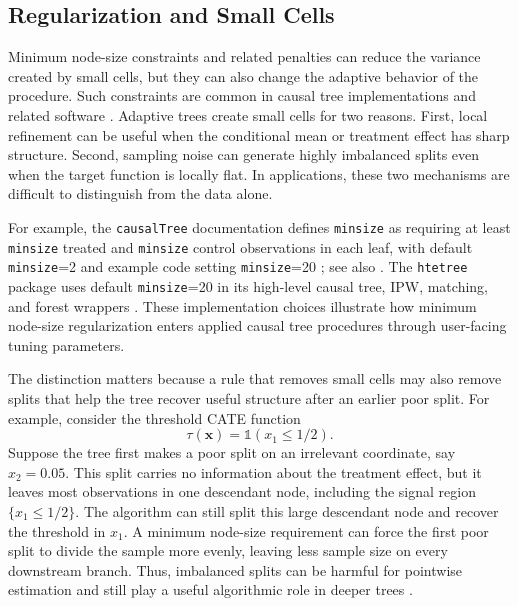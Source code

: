 \documentclass[10pt]{article}
\def\bx{\mathbf{x}}
\newcommand{\Indicator}{\mathds{1}}
\theoremstyle{definition}
\theoremstyle{remark}
\begin{document}
\subsection{Regularization and Small Cells}\label{sa-sec:regularization-details}

Minimum node-size constraints and related penalties can reduce the variance created by small cells, but they can also change the adaptive behavior of the procedure. Such constraints are common in causal tree implementations \citep[Online Appendix]{Athey-Imbens_2016_PNAS} and related software \citep{Athey-Imbens_2026_causalTree,Xu-Shinkre-Brand_2026_htetree}. Adaptive trees create small cells for two reasons. First, local refinement can be useful when the conditional mean or treatment effect has sharp structure. Second, sampling noise can generate highly imbalanced splits even when the target function is locally flat. In applications, these two mechanisms are difficult to distinguish from the data alone.

For example, the \texttt{causalTree} documentation defines \texttt{minsize} as requiring at least \texttt{minsize} treated and \texttt{minsize} control observations in each leaf, with default \texttt{minsize}=2 and example code setting \texttt{minsize}=20 \citep[Online Appendix]{Athey-Imbens_2016_PNAS}; see also \citet{Athey-Imbens_2026_causalTree}. The \texttt{htetree} package uses default \texttt{minsize}=20 in its high-level causal tree, IPW, matching, and forest wrappers \citep{Xu-Shinkre-Brand_2026_htetree}. These implementation choices illustrate how minimum node-size regularization enters applied causal tree procedures through user-facing tuning parameters.

The distinction matters because a rule that removes small cells may also remove splits that help the tree recover useful structure after an earlier poor split. For example, consider the threshold CATE function
\[
    \tau(\bx) = \Indicator(x_1 \le 1/2).
\]
Suppose the tree first makes a poor split on an irrelevant coordinate, say $x_2 = 0.05$. This split carries no information about the treatment effect, but it leaves most observations in one descendant node, including the signal region $\{x_1 \le 1/2\}$. The algorithm can still split this large descendant node and recover the threshold in $x_1$. A minimum node-size requirement can force the first poor split to divide the sample more evenly, leaving less sample size on every downstream branch. Thus, imbalanced splits can be harmful for pointwise estimation and still play a useful algorithmic role in deeper trees \citep{ishwaran2015effect}.
\end{document}
